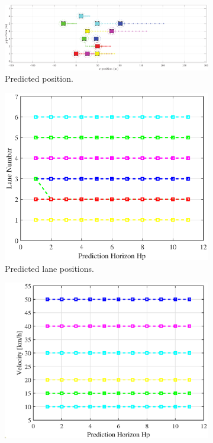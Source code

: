 \begin{figure}[H]
\centering
\begin{subfigure}[t]{\textwidth}
    \includegraphics[width=\textwidth]{Kap6/obs_avoid/obs_avoid_traj20.eps}
    \caption{Predicted position.}
    \label{fig:first_mpc10}
\end{subfigure}
\vspace{1cm}
\begin{subfigure}[b]{0.45\textwidth}
    \includegraphics[width=\textwidth]{Kap6/obs_avoid/obs_avoid_lane20.eps}
    \caption{Predicted lane positions.}
    \label{fig:second_mpc10_obsav}
\end{subfigure}
\hfill
\begin{subfigure}[b]{0.45\textwidth}
    \includegraphics[width=\textwidth]{Kap6/obs_avoid/obs_avoid_vel20.eps}

\end{subfigure}
\end{figure}
